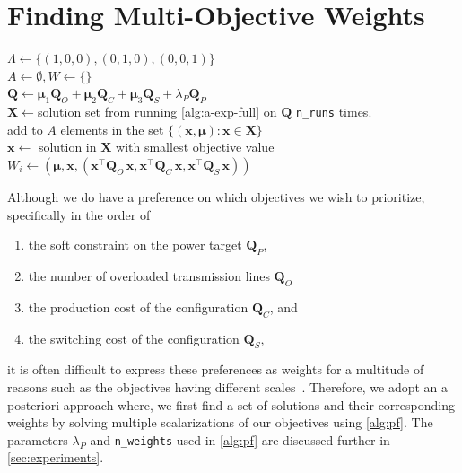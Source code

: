 \documentclass[conference]{IEEEtran}
\newcommand{\bX}{\boldsymbol{X}}
\newcommand{\bQ}{\boldsymbol{Q}}
\newcommand{\trans}{\intercal}
\newcommand{\bx}{\boldsymbol{x}}
\begin{document}
\section{Finding Multi-Objective Weights}\label{sec:multi-obj}
\begin{algorithm}[t!]
  \SetAlgoNoEnd
  \SetAlgoVlined
  \caption{Averaging Adaptive
    Method~\cite{ayodele2023}}\label{alg:pf}
  \KwIn{$\bQ_{O}$, $\bQ_{C}$, $\bQ_{S}$, $\lambda_{P}$, $\bQ_{P}$,
    \texttt{n\_weights}, \texttt{n\_runs}}
  $\Lambda \gets \{(1,0,0), (0,1,0), (0,0,1)\}$\\
  $A\gets\emptyset, W\gets\{\}$\\
   {
    $\bQ \gets \bm{\mu}_{1}\bQ_{O} + \bm{\mu}_{2}\bQ_{C} +
    \bm{\mu}_{3}\bQ_{S} + \lambda_{P}\bQ_{P}$\\
    $\bX \gets$solution set from running \cref{alg:a-exp-full} on $\bQ$
    \texttt{n\_runs} times.\\
    add to $A$ elements in the set $\{(\bx, \bm{\mu}) : \bx \in \bX\}$\\
    $\bx \gets $ solution in $\bX$ with smallest objective value\\
    $W_{i} \gets (\bm{\mu}, \bx, (\bx^{\trans}\bQ_{O}\,\bx,
    \bx^{\trans}\bQ_{C}\,\bx, \bx^{\trans}\bQ_{S}\,\bx))$\\
  }
\end{algorithm}

Although we do have a preference on which objectives we wish to
prioritize, specifically in the order of
\begin{enumerate}
\item the soft constraint on the power target $\bQ_{P}$,
\item the number of overloaded transmission lines $\bQ_{O}$
\item the production cost of the configuration $\bQ_{C}$, and
\item the switching cost of the configuration $\bQ_{S}$,
\end{enumerate}
it is often difficult to express these preferences as weights for a
multitude of reasons such as the objectives having different
scales~\cite{miettinen2008}. Therefore, we adopt an a posteriori
approach where, we first find a set of solutions and their
corresponding weights by solving multiple scalarizations of our
objectives using \cref{alg:pf}. The parameters $\lambda_{P}$ and
\texttt{n\_weights} used in \cref{alg:pf} are discussed further in
\cref{sec:experiments}.
\end{document}
